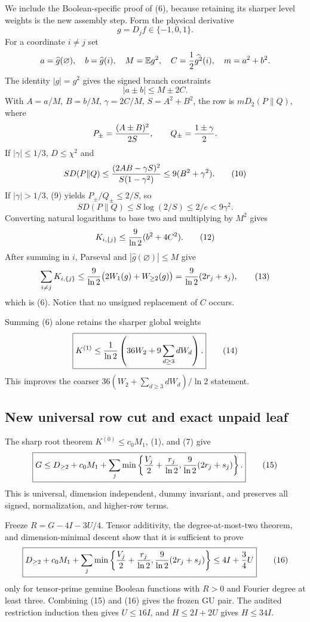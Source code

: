We include the Boolean-specific proof of (6), because retaining its sharper
level weights is the new assembly step.  Form the physical derivative
\[
 g=D_jf\in\{-1,0,1\}.
\]
For a coordinate $i\ne j$ set
\[
 a=\widehat g(\varnothing),\quad b=\widehat g(i),\quad
 M=\mathbb E g^2,\quad C={1\over2}\widehat{g^2}(i),\quad m=a^2+b^2.
\]
The identity $|g|=g^2$ gives the signed branch constraints
\[
 |a\pm b|\le M\pm2C.                                             \tag{9}
\]
With $A=a/M$, $B=b/M$, $\gamma=2C/M$, $S=A^2+B^2$, the row is
$mD_2(P\|Q)$, where
\[
 P_\pm={(A\pm B)^2\over2S},\qquad Q_\pm={1\pm\gamma\over2}.
\]
If $|\gamma|\le1/3$, $D\le\chi^2$ and
\[
 S D(P\|Q)\le{(2AB-\gamma S)^2\over S(1-\gamma^2)}
 \le9(B^2+\gamma^2).                                             \tag{10}
\]
If $|\gamma|>1/3$, (9) yields $P_\pm/Q_\pm\le2/S$, so
\[
 S D(P\|Q)\le S\log(2/S)\le2/e<9\gamma^2.                       \tag{11}
\]
Converting natural logarithms to base two and multiplying by $M^2$ gives
\[
 K_{i,\{j\}}\le {9\over\ln2}(b^2+4C^2).                        \tag{12}
\]
After summing in $i$, Parseval and $|\widehat g(\varnothing)|\le M$ give
\[
 \sum_{i\ne j}K_{i,\{j\}}
 \le {9\over\ln2}\bigl(2W_1(g)+W_{\ge2}(g)\bigr)
 ={9\over\ln2}(2r_j+s_j),                                      \tag{13}
\]
which is (6).  Notice that no unsigned replacement of $C$ occurs.

Summing (6) alone retains the sharper global weights
\[
 \boxed{K^{(1)}\le {1\over\ln2}
 \left(36W_2+9\sum_{d\ge3}dW_d\right).}                         \tag{14}
\]
This improves the coarser $36(W_2+\sum_{d\ge3}dW_d)/\ln2$ statement.

\subsection*{New universal row cut and exact unpaid leaf}

The sharp root theorem $K^{(0)}\le c_0M_1$, (1), and (7) give
\[
 \boxed{
 G\le D_{\ge2}+c_0M_1+
 \sum_j\min\left\{{V_j\over2}+{r_j\over\ln2},
 {9\over\ln2}(2r_j+s_j)\right\}.}                              \tag{15}
\]
This is universal, dimension independent, dummy invariant, and preserves
all signed, normalization, and higher-row terms.

Freeze $R=G-4I-3U/4$.  Tensor additivity, the degree-at-most-two theorem,
and dimension-minimal descent show that it is sufficient to prove
\[
 \boxed{
 D_{\ge2}+c_0M_1+
 \sum_j\min\left\{{V_j\over2}+{r_j\over\ln2},
 {9\over\ln2}(2r_j+s_j)\right\}
 \le4I+{3\over4}U}                                               \tag{16}
\]
only for tensor-prime genuine Boolean functions with $R>0$ and Fourier
degree at least three.  Combining (15) and (16) gives the frozen GU pair.
The audited restriction induction then gives $U\le16I$, and
$H\le2I+2U$ gives $H\le34I$.

